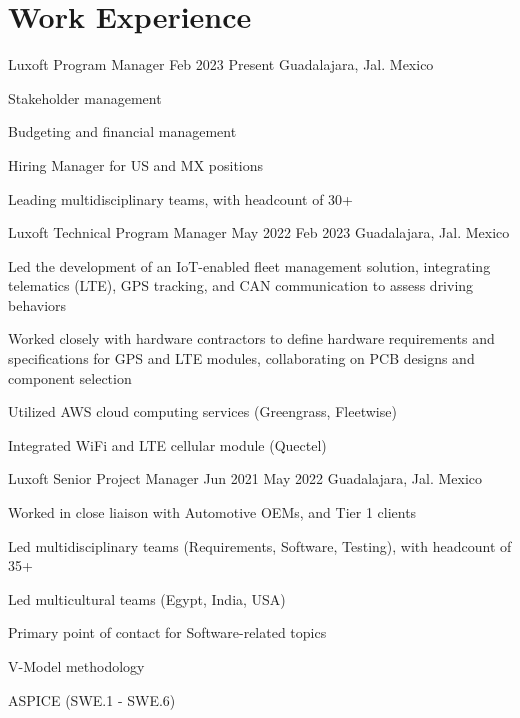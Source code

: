 
\section{Work Experience}

\job
    {Luxoft}
    {Program Manager}
    {Feb 2023}
    {Present}
    {Guadalajara, Jal. Mexico}
    {
        \begin{itemize-bullets}
            \item{Stakeholder management}
            \item{Budgeting and financial management}
            \item{Hiring Manager for US and MX positions}
            \item{Leading multidisciplinary teams, with headcount of 30+}
        \end{itemize-bullets}
    }

\job
    {Luxoft}
    {Technical Program Manager}
    {May 2022}
    {Feb 2023}
    {Guadalajara, Jal. Mexico}
    {
        \begin{itemize-bullets}
            \item{Led the development of an IoT-enabled fleet management solution, integrating telematics (LTE), GPS tracking, and CAN communication to assess driving behaviors}
            \item{Worked closely with hardware contractors to define hardware requirements and specifications for GPS and LTE modules, collaborating on PCB designs and component selection}
            \item{Utilized AWS cloud computing services (Greengrass, Fleetwise)}
            \item{Integrated WiFi and LTE cellular module (Quectel)}
        \end{itemize-bullets}
    }

\job
    {Luxoft}
    {Senior Project Manager}
    {Jun 2021}
    {May 2022}
    {Guadalajara, Jal. Mexico}
    {
        \begin{itemize-bullets}
            \item{Worked in close liaison with Automotive OEMs, and Tier 1 clients}
            \item{Led multidisciplinary teams (Requirements, Software, Testing), with headcount of 35+}
            \item{Led multicultural teams (Egypt, India, USA)}
            \item{Primary point of contact for Software-related topics}
            \item{V-Model methodology}
            \item{ASPICE (SWE.1 - SWE.6)}
        \end{itemize-bullets}
    }


